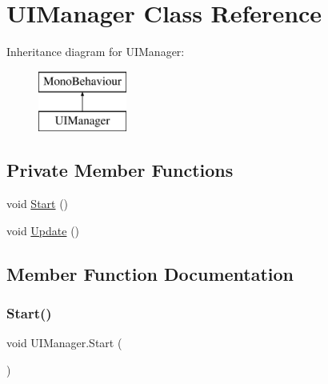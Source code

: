 \hypertarget{class_u_i_manager}{}\section{U\+I\+Manager Class Reference}
\label{class_u_i_manager}
Inheritance diagram for U\+I\+Manager\+:\begin{figure}[H]
\begin{center}
\leavevmode
\includegraphics[height=2.000000cm]{class_u_i_manager}
\end{center}
\end{figure}
\subsection*{Private Member Functions}
\begin{DoxyCompactItemize}
\item 
void \hyperlink{class_u_i_manager_a2bd6b48b13b9e14e6292e4b713f59584}{Start} ()
\item 
void \hyperlink{class_u_i_manager_a6e2db9f2d98e70ccc4864d3af73f1b9e}{Update} ()
\end{DoxyCompactItemize}


\subsection{Member Function Documentation}
\mbox{\label{class_u_i_manager_a2bd6b48b13b9e14e6292e4b713f59584}} 
\subsubsection{\texorpdfstring{Start()}{Start()}}
{\footnotesize\ttfamily void U\+I\+Manager.\+Start (\begin{DoxyParamCaption}{ }\end{DoxyParamCaption})\hspace{0.3cm}{\ttfamily [private]}}

\mbox{\label{class_u_i_manager_a6e2db9f2d98e70ccc4864d3af73f1b9e}} 
